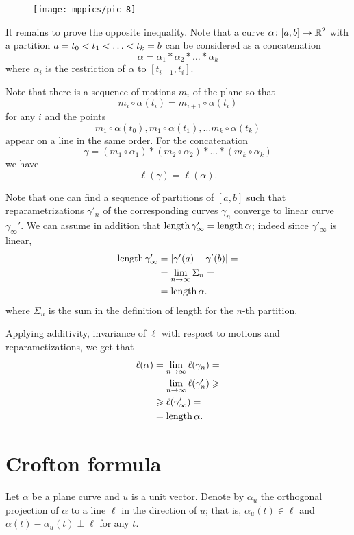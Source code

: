 \begin{wrapfigure}{r}{36 mm}
\vskip-4mm
\centering
\texttt{[image: mppics/pic-8]}
\end{wrapfigure}

It remains to prove the opposite inequality.
Note that a curve $\alpha\colon[a,b]\to \mathbb{R}^2$ with a partition $a=t_0\z<t_1\z<\z\dots\z<t_k=b$ can be considered as a concatenation
\[\alpha=\alpha_1*\alpha_2*\dots*\alpha_k\]
where $\alpha_i$ is the restriction of $\alpha$ to $[t_{i-1},t_i]$.

Note that there is a sequence of motions $m_i$ of the plane so that 
\[m_i\circ\alpha(t_i)=m_{i+1}\circ\alpha(t_i)\] 
for any $i$ and 
the points 
\[m_1\circ\alpha(t_0), m_1\circ\alpha(t_1),\dots m_k\circ\alpha(t_k)\] 
appear on a line in the same order.
For the concatenation 
\[\gamma=(m_1\circ\alpha_1)*(m_2\circ\alpha_2)*\dots*(m_k\circ\alpha_k)\]
we have
\[\ell(\gamma)=\ell(\alpha).\]

Note that one can find a sequence of partitions of $[a,b]$ such that reparametrizations $\gamma'_n$ of 
the corresponding curves $\gamma_n$ converge to linear curve $\gamma_\infty'$.
We can assume in addition that $\mathop{\rm length}\nolimits\gamma'_\infty=\mathop{\rm length}\nolimits\alpha$;
indeed since $\gamma'_\infty$ is linear,
\begin{align*}
\mathop{\rm length}\nolimits \gamma'_\infty&=|\gamma'(a)-\gamma'(b)|=
\\
&=\lim_{n\to\infty}\Sigma_n=
\\
&=\mathop{\rm length}\nolimits\alpha.
\end{align*}
where $\Sigma_n$ is the sum in the definition of length for the $n$-th partition.

Applying additivity, invariance of $\ell$ with respact to motions and reparametizations, we get that
\begin{align*}
\ell(\alpha)&=\lim_{n\to\infty}\ell(\gamma_n)=
\\
&=\lim_{n\to\infty}\ell(\gamma_n')\geqslant
\\
&\geqslant \ell(\gamma_\infty')=
\\
&=\mathop{\rm length}\nolimits\alpha.
\end{align*}
\qedsf




\section{Crofton formula}

Let $\alpha$ be a plane curve and $u$ is a unit vector.
Denote by $\alpha_u$ the orthogonal projection of $\alpha$ to a line $\ell$ in the direction of $u$;
that is, $\alpha_u(t)\in\ell$ and $\alpha(t)-\alpha_u(t)\perp \ell$ for any $t$.

